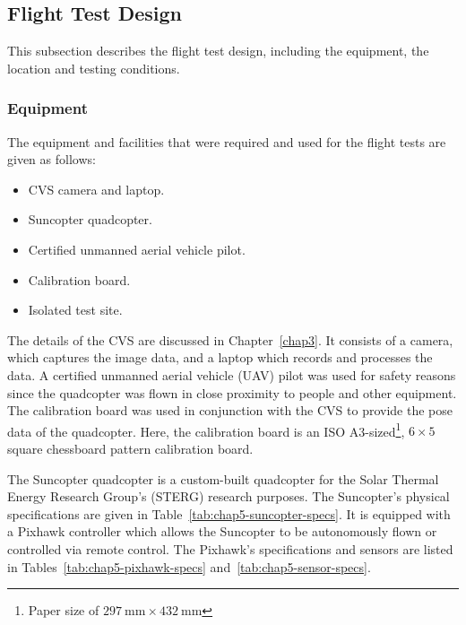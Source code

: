 \subsection{Flight Test Design}

This subsection describes the flight test design, including the equipment, the location and testing conditions.

\subsubsection{Equipment}

The equipment and facilities that were required and used for the flight tests are given as follows:

\begin{itemize}
    \item CVS camera and laptop.
    \item Suncopter quadcopter.
    \item Certified unmanned aerial vehicle pilot.
    \item Calibration board.
    \item Isolated test site. 
\end{itemize}

The details of the CVS are discussed in Chapter~\ref{chap3}. It consists of a camera, which captures the image data, and a laptop which records and processes the data. A certified unmanned aerial vehicle (UAV) pilot was used for safety reasons since the quadcopter was flown in close proximity to people and other equipment. The calibration board was used in conjunction with the CVS to provide the pose data of the quadcopter. Here, the calibration board is an ISO A3-sized\footnote{Paper size of $\SI{297}{\mm}\times\SI{432}{\mm}$}, $6\times5$ square chessboard pattern calibration board. 

The Suncopter quadcopter is a custom-built quadcopter for the Solar Thermal Energy Research Group's (STERG) research purposes. The Suncopter's physical specifications are given in Table~\ref{tab:chap5-suncopter-specs}. It is equipped with a Pixhawk controller which allows the Suncopter to be autonomously flown or controlled via remote control. The Pixhawk's specifications and sensors are listed in Tables~\ref{tab:chap5-pixhawk-specs} and~\ref{tab:chap5-sensor-specs}.

